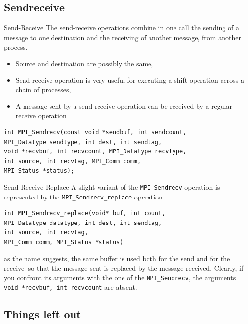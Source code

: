 \documentclass[xcolor={svgnames,usenames}]{beamer}
\begin{document}
\subsection{Sendreceive}

\begin{frame}[fragile]{Send-Receive}
The \alert{send-receive} operations combine in one call the sending of a message to one destination and the receiving of another message, from another process.
\begin{itemize}
\item Source and destination are possibly the same,
\item Send-receive operation is very useful for executing a shift operation across a chain of processes,
\item A message sent by a send-receive operation can be received by a regular receive operation
\end{itemize}
\begin{verbatim}
int MPI_Sendrecv(const void *sendbuf, int sendcount, 
MPI_Datatype sendtype, int dest, int sendtag, 
void *recvbuf, int recvcount, MPI_Datatype recvtype, 
int source, int recvtag, MPI_Comm comm,
MPI_Status *status);
\end{verbatim}
\end{frame}

\begin{frame}[fragile]{Send-Receive-Replace}
A slight variant of the \texttt{MPI_Sendrecv} operation is represented by the \texttt{MPI_Sendrecv_replace} operation
\begin{verbatim}
int MPI_Sendrecv_replace(void* buf, int count, 
MPI_Datatype datatype, int dest, int sendtag, 
int source, int recvtag, 
MPI_Comm comm, MPI_Status *status)
\end{verbatim}
as the name suggests, the same buffer is used both for the send and
for the receive, so that the message sent is replaced by the message received.
\vfill
Clearly, if you confront its arguments with the one of the \texttt{MPI_Sendrecv}, the arguments \texttt{void *recvbuf, int recvcount} are absent.
\end{frame}

\subsection{Things left out}
\end{document}
